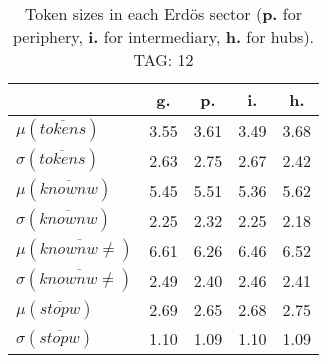 \begin{table}[h!]
\begin{center}
\begin{tabular}{| l | c | c | c | c |}\hline
 & g. & p. & i. & h. \\\hline
$\mu(\overline{tokens})$ & 3.55  & 3.61  & 3.49  & 3.68 \\\hline
$\sigma(\overline{tokens})$ & 2.63  & 2.75  & 2.67  & 2.42 \\\hline
$\mu(\overline{knownw})$ & 5.45  & 5.51  & 5.36  & 5.62 \\\hline
$\sigma(\overline{knownw})$ & 2.25  & 2.32  & 2.25  & 2.18 \\\hline
$\mu(\overline{knownw \neq})$ & 6.61  & 6.26  & 6.46  & 6.52 \\\hline
$\sigma(\overline{knownw \neq})$ & 2.49  & 2.40  & 2.46  & 2.41 \\\hline
$\mu(\overline{stopw})$ & 2.69  & 2.65  & 2.68  & 2.75 \\\hline
$\sigma(\overline{stopw})$ & 1.10  & 1.09  & 1.10  & 1.09 \\\hline
\end{tabular}
\caption{Token sizes in each Erd\"os sector ({{\bf p.}} for periphery, {{\bf i.}} for intermediary, {{\bf h.}} for hubs). TAG: 12}
\end{center}
\end{table}